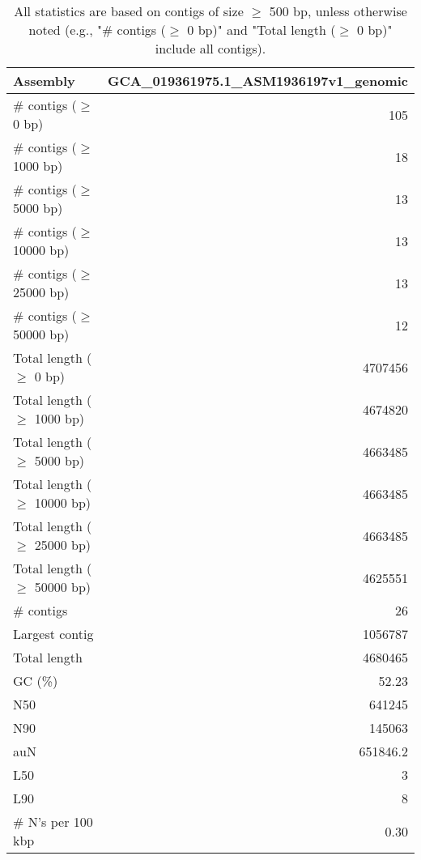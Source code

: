 \documentclass[12pt,a4paper]{article}
\begin{document}
\begin{table}[ht]
\begin{center}
\caption{All statistics are based on contigs of size $\geq$ 500 bp, unless otherwise noted (e.g., "\# contigs ($\geq$ 0 bp)" and "Total length ($\geq$ 0 bp)" include all contigs).}
\begin{tabular}{|l*{1}{|r}|}
\hline
Assembly & GCA\_019361975.1\_ASM1936197v1\_genomic \\ \hline
\# contigs ($\geq$ 0 bp) & 105 \\ \hline
\# contigs ($\geq$ 1000 bp) & 18 \\ \hline
\# contigs ($\geq$ 5000 bp) & 13 \\ \hline
\# contigs ($\geq$ 10000 bp) & 13 \\ \hline
\# contigs ($\geq$ 25000 bp) & 13 \\ \hline
\# contigs ($\geq$ 50000 bp) & 12 \\ \hline
Total length ($\geq$ 0 bp) & 4707456 \\ \hline
Total length ($\geq$ 1000 bp) & 4674820 \\ \hline
Total length ($\geq$ 5000 bp) & 4663485 \\ \hline
Total length ($\geq$ 10000 bp) & 4663485 \\ \hline
Total length ($\geq$ 25000 bp) & 4663485 \\ \hline
Total length ($\geq$ 50000 bp) & 4625551 \\ \hline
\# contigs & 26 \\ \hline
Largest contig & 1056787 \\ \hline
Total length & 4680465 \\ \hline
GC (\%) & 52.23 \\ \hline
N50 & 641245 \\ \hline
N90 & 145063 \\ \hline
auN & 651846.2 \\ \hline
L50 & 3 \\ \hline
L90 & 8 \\ \hline
\# N's per 100 kbp & 0.30 \\ \hline
\end{tabular}
\end{center}
\end{table}
\end{document}
